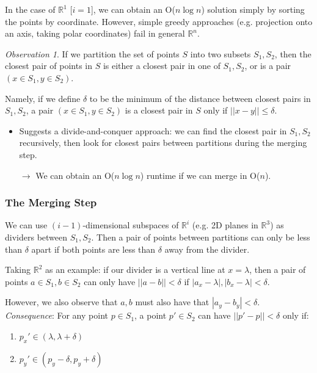 \documentclass[12pt]{extarticle}
\theoremstyle{definition}
\theoremstyle{remark}
\newtheorem*{observation}{Observation}
\begin{document}
\noindent In the case of $\mathbb{R}^1$ [$i=1$], we can obtain an O($n\log n$) solution simply by sorting the points by coordinate. However, simple greedy approaches (e.g. projection onto an axis, taking polar coordinates) fail in general $\mathbb{R}^n$.

\begin{observation}
    If we partition the set of points $S$ into two subsets $S_1,S_2$, then the closest pair of points in $S$ is either a closest pair in one of $S_1,S_2$, or is a pair $(x\in S_1,y\in S_2)$.
    
    \vspace{6pt}
    Namely, if we define $\delta$ to be the minimum of the distance between closest pairs in $S_1,S_2$, a pair $(x\in S_1,y\in S_2)$ is a closest pair in $S$ only if $||x-y||\leq\delta$. \begin{itemize}
        \item Suggests a divide-and-conquer approach: we can find the closest pair in $S_1,S_2$ recursively, then look for closest pairs between partitions during the merging step. 

        $\to$ We can obtain an O($n\log n$) runtime if we can merge in O($n$).
    \end{itemize}
\end{observation}

\subsubsection*{The Merging Step}
We can use $(i-1)$-dimensional subspaces of $\mathbb{R}^i$ (e.g. 2D planes in $\mathbb{R}^3$) as dividers between $S_1,S_2$. Then a pair of points between partitions can only be less than $\delta$ apart if both points are less than $\delta$ away from the divider.

Taking $\mathbb{R}^2$ as an example: if our divider is a vertical line at $x=\lambda$, then a pair of points $a\in S_1,b\in S_2$ can only have $||a-b||<\delta$ if $|a_x-\lambda|,|b_x-\lambda|<\delta$.

However, we also observe that $a,b$ must also have that $|a_y-b_y|<\delta$.\\

\noindent \textit{Consequence}: For any point $p\in S_1$, a point $p'\in S_2$ can have $||p'-p||<\delta$ only if: 
\begin{enumerate}
    \item $p_x'\in(\lambda,\lambda+\delta)$
    \item $p_y'\in(p_y-\delta,p_y+\delta)$
\end{enumerate}
\end{document}
